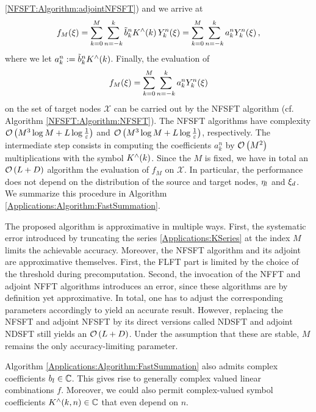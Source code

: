 \ref{NFSFT:Algorithm:adjointNFSFT}) and we arrive at
\[
  f_{M}{\hspace{-0.4ex}}\left(\xi\right) = \sum_{k=0}^{M} \sum_{n=-k}^k \tilde{b}_{k}^n K^{\wedge}{\hspace{-0.4ex}}\left(k\right)
                     Y_{k}^n{\hspace{-0.4ex}}\left(\mathbf{\xi}\right) = \sum_{k=0}^{M} \sum_{n=-k}^k a_{k}^n
                     Y_{k}^n{\hspace{-0.4ex}}\left(\mathbf{\xi}\right),
\]
where we let $a_{k}^n := \tilde{b}_{k}^n K^{\wedge}{\hspace{-0.4ex}}\left(k\right)$. Finally, the evaluation of
\begin{equation}
\label{Applications:NDSFT}
  f_{M}{\hspace{-0.4ex}}\left(\mathbf{\xi}\right) = \sum_{k=0}^{M} \sum_{n=-k}^k a_{k}^n Y_{k}^n{\hspace{-0.4ex}}\left(\mathbf{\xi}\right)
\end{equation}
on the set of target nodes $\mathcal{X}$ can be carried out by the NFSFT algorithm 
(cf. Algorithm \ref{NFSFT:Algorithm:NFSFT}). The NFSFT algorithms have complexity 
$\mathcal{O}\left(M^3 \log M + L \log \frac{1}{\varepsilon}\right)$ and 
$\mathcal{O}\left(M^3 \log M + L \log \frac{1}{\varepsilon}\right)$, respectively. The intermediate 
step consists in computing the coefficients $a_{k}^n$ by $\mathcal{O}\left(M^2\right)$ multiplications
with the symbol $K^{\wedge}{\hspace{-0.4ex}}\left(k\right)$. Since the $M$ is fixed, we have in total an
$\mathcal{O}\left(L + D\right)$ algorithm the evaluation of $f_{M}$ on $\mathcal{X}$. In particular, the
performance does not depend on the distribution of the source and target nodes, 
$\mathbf{\eta}_{l}$ and $\mathbf{\xi}_{d}$. We summarize this procedure in Algorithm 
\ref{Applications:Algorithm:FastSummation}.

\begin{remark}
  The proposed algorithm is approximative in multiple ways. First, the systematic 
  error introduced by truncating the series \eqref{Applications:KSeries} at the 
  index $M$ limits the 
  achievable accuracy. Moreover, the NFSFT algorithm and its adjoint 
  are approximative themselves. First, the FLFT part is limited by the choice of the
  threshold during precomputation. Second, the invocation of the NFFT and adjoint 
  NFFT algorithms introduces an error, since these algorithms are by definition yet
  approximative. In total, one has to adjust the corresponding parameters accordingly 
  to yield an accurate result.
  However, replacing the NFSFT and adjoint NFSFT by its direct versions called NDSFT and 
  adjoint NDSFT still yields an $\mathcal{O}\left(L + D\right)$. Under the assumption that these are 
  stable, $M$ remains the only accuracy-limiting parameter.
\end{remark}

\begin{remark}
  Algorithm \ref{Applications:Algorithm:FastSummation} also admits complex 
  coefficients $b_{l} \in \mathbb{C}$. This gives rise to generally complex valued 
  linear combinations $f$. Moreover, we could also permit complex-valued 
  symbol coefficients $K^{\wedge}{\hspace{-0.4ex}}\left(k,n\right) \in \mathbb{C}$ that even depend on $n$. 
\end{remark}

